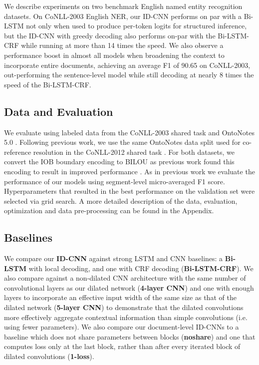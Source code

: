 \documentclass[11pt,letterpaper]{article}
\begin{document}
We describe experiments on two benchmark English named entity recognition datasets. On CoNLL-2003 English NER, our ID-CNN performs on par with a Bi-LSTM not only when used to produce per-token logits for structured inference, but the ID-CNN with greedy decoding also performs on-par with the Bi-LSTM-CRF while running at more than 14 times the speed. We also observe a performance boost in almost all models when broadening the context to incorporate entire documents, achieving an average F1 of 90.65 on CoNLL-2003, out-performing the sentence-level model while still decoding at nearly 8 times the speed of the Bi-LSTM-CRF.

\subsection{Data and Evaluation}
We evaluate using labeled data from the CoNLL-2003 shared task \citep{tjong2003introduction} and OntoNotes 5.0 \citep{hovy2006ontonotes,pradhan2013towards}. Following previous work, we use the same OntoNotes data split used for co-reference resolution in the CoNLL-2012 shared task \citep{pradhan2012conll}.
For both datasets, we convert the IOB boundary encoding to BILOU as previous work found this encoding to result in improved performance \citep{ratinov2009design}. As in previous work we evaluate the performance of our models using segment-level micro-averaged F1 score. Hyperparameters that resulted in the best performance on the validation set were selected via grid search. A more detailed description of the data, evaluation, optimization and data pre-processing can be found in the Appendix.

\subsection{Baselines \label{baselines-sec}}

We compare our {\bf ID-CNN} against strong LSTM and CNN baselines: a {\bf Bi-LSTM} with local decoding, and one with CRF decoding ({\bf Bi-LSTM-CRF}). We also compare against a non-dilated CNN architecture with the same number of convolutional layers as our dilated network ({\bf 4-layer CNN}) and one with enough layers to incorporate an effective input width of the same size as that of the dilated network ({\bf 5-layer CNN}) to demonstrate that the dilated convolutions more effectively aggregate contextual information than simple convolutions (i.e. using fewer parameters). We also compare our document-level ID-CNNs to a baseline which does not share parameters between blocks ({\bf noshare}) and one that computes loss only at the last block, rather than after every iterated block of dilated convolutions ({\bf 1-loss}).
\end{document}
